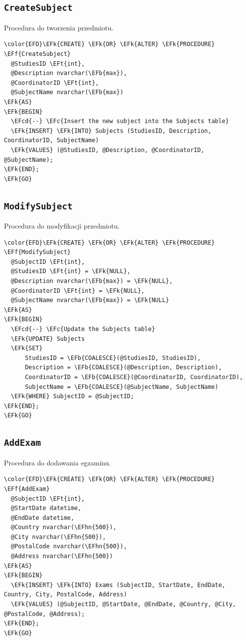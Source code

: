 \documentclass[11pt]{article}
\newcommand{\EFc}[1]{\textcolor{EFc}{\textit{#1}}} %
\newcommand{\EFcd}[1]{\textcolor{EFcd}{\textit{#1}}} %
\newcommand{\EFk}[1]{\textcolor{EFk}{\textbf{#1}}} %
\newcommand{\EFb}[1]{\textcolor{EFb}{\textbf{#1}}} %
\newcommand{\EFf}[1]{\textcolor{EFf}{#1}} %
\newcommand{\EFt}[1]{\textcolor{EFt}{\textbf{#1}}} %
\newcommand{\EFhn}[1]{\textcolor{EFhn}{#1}} %
\begin{document}
\subsection{\texttt{CreateSubject}}
\label{sec:org8a0394a}
Procedura do tworzenia przedmiotu.
\begin{Code}
\begin{Verbatim}
\color{EFD}\EFk{CREATE} \EFk{OR} \EFk{ALTER} \EFk{PROCEDURE} \EFf{CreateSubject}
  @StudiesID \EFt{int},
  @Description nvarchar(\EFb{max}),
  @CoordinatorID \EFt{int},
  @SubjectName nvarchar(\EFb{max})
\EFk{AS}
\EFk{BEGIN}
  \EFcd{--} \EFc{Insert the new subject into the Subjects table}
  \EFk{INSERT} \EFk{INTO} Subjects (StudiesID, Description, CoordinatorID, SubjectName)
  \EFk{VALUES} (@StudiesID, @Description, @CoordinatorID, @SubjectName);
\EFk{END};
\EFk{GO}
\end{Verbatim}
\end{Code}
\subsection{\texttt{ModifySubject}}
\label{sec:orga902a52}
Procedura do modyfikacji przedmiotu.
\begin{Code}
\begin{Verbatim}
\color{EFD}\EFk{CREATE} \EFk{OR} \EFk{ALTER} \EFk{PROCEDURE} \EFf{ModifySubject}
  @SubjectID \EFt{int},
  @StudiesID \EFt{int} = \EFk{NULL},
  @Description nvarchar(\EFb{max}) = \EFk{NULL},
  @CoordinatorID \EFt{int} = \EFk{NULL},
  @SubjectName nvarchar(\EFb{max}) = \EFk{NULL}
\EFk{AS}
\EFk{BEGIN}
  \EFcd{--} \EFc{Update the Subjects table}
  \EFk{UPDATE} Subjects
  \EFk{SET}
      StudiesID = \EFb{COALESCE}(@StudiesID, StudiesID),
      Description = \EFb{COALESCE}(@Description, Description),
      CoordinatorID = \EFb{COALESCE}(@CoordinatorID, CoordinatorID),
      SubjectName = \EFb{COALESCE}(@SubjectName, SubjectName)
  \EFk{WHERE} SubjectID = @SubjectID;
\EFk{END};
\EFk{GO}
\end{Verbatim}
\end{Code}
\subsection{\texttt{AddExam}}
\label{sec:org980dd87}
Procedura do dodawania egzaminu.
\begin{Code}
\begin{Verbatim}
\color{EFD}\EFk{CREATE} \EFk{OR} \EFk{ALTER} \EFk{PROCEDURE} \EFf{AddExam}
  @SubjectID \EFt{int},
  @StartDate datetime,
  @EndDate datetime,
  @Country nvarchar(\EFhn{500}),
  @City nvarchar(\EFhn{500}),
  @PostalCode nvarchar(\EFhn{500}),
  @Address nvarchar(\EFhn{500})
\EFk{AS}
\EFk{BEGIN}
  \EFk{INSERT} \EFk{INTO} Exams (SubjectID, StartDate, EndDate, Country, City, PostalCode, Address)
  \EFk{VALUES} (@SubjectID, @StartDate, @EndDate, @Country, @City, @PostalCode, @Address);
\EFk{END};
\EFk{GO}
\end{Verbatim}
\end{Code}
\end{document}
